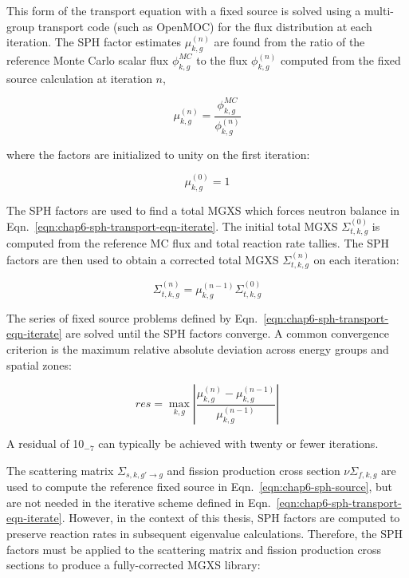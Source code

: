 \noindent This form of the transport equation with a fixed source is solved using a multi-group transport code (such as OpenMOC) for the flux distribution at each iteration. The \ac{SPH} factor estimates $\mu_{k,g}^{(n)}$ are found from the ratio of the reference Monte Carlo scalar flux $\phi_{k,g}^{MC}$ to the flux $\phi_{k,g}^{(n)}$ computed from the fixed source calculation at iteration $n$,

\begin{equation}
\label{eqn:chap6-sph-update}
\mu_{k,g}^{(n)} = \frac{\phi_{k,g}^{MC}}{\phi_{k,g}^{(n)}}
\end{equation}

\noindent where the factors are initialized to unity on the first iteration:

\begin{dmath}
\label{eqn:chap6-sph-initial}
\mu_{k,g}^{(0)} = 1
\end{dmath}

The \ac{SPH} factors are used to find a total \ac{MGXS} which forces neutron balance in Eqn.~\ref{eqn:chap6-sph-transport-eqn-iterate}. The initial total \ac{MGXS} $\Sigma_{t,k,g}^{(0)}$ is computed from the reference \ac{MC} flux and total reaction rate tallies. The \ac{SPH} factors are then used to obtain a corrected total \ac{MGXS} $\Sigma_{t,k,g}^{(n)}$ on each iteration:

\begin{dmath}
\label{eqn:chap6-sph-update-sigt}
\Sigma_{t,k,g}^{(n)} = \mu_{k,g}^{(n-1)}\Sigma_{t,k,g}^{(0)}
\end{dmath}

The series of fixed source problems defined by Eqn.~\ref{eqn:chap6-sph-transport-eqn-iterate} are solved until the \ac{SPH} factors converge. A common convergence criterion is the maximum relative absolute deviation across energy groups and spatial zones:

\begin{dmath}
\label{eqn:chap6-sph-residual}
res = \max_{k,g} \left|\frac{\mu_{k,g}^{(n)} - \mu_{k,g}^{(n-1)}}{\mu_{k,g}^{(n-1)}}\right|
\end{dmath}

\noindent A residual of 10$_{-7}$ can typically be achieved with twenty or fewer iterations.

The scattering matrix $\Sigma_{s,k,g'\rightarrow g}$ and fission production cross section $\nu\Sigma_{f,k,g}$ are used to compute the reference fixed source in Eqn.~\ref{eqn:chap6-sph-source}, but are not needed in the iterative scheme defined in Eqn.~\ref{eqn:chap6-sph-transport-eqn-iterate}. However, in the context of this thesis, \ac{SPH} factors are computed to preserve reaction rates in subsequent eigenvalue calculations. Therefore, the \ac{SPH} factors must be applied to the scattering matrix and fission production cross sections to produce a fully-corrected \ac{MGXS} library:

